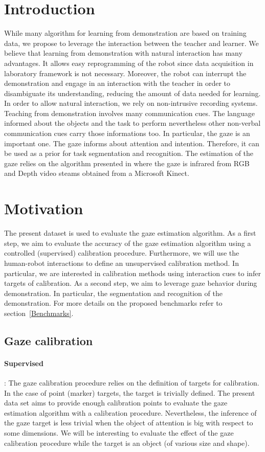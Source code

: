 \documentclass[11pt,a4paper]{article}
\begin{document}
\section{Introduction}
While many algorithm for learning from demonstration are based on training data, we propose to leverage the interaction between the teacher and learner. We believe that learning from demonstration with natural interaction has many advantages. It allows easy reprogramming of the robot since data acquisition in laboratory framework is not necessary. Moreover, the robot can interrupt the demonstration and engage in an interaction with the teacher in order to disambiguate its understanding, reducing the amount of data needed for learning.
\newline
In order to allow natural interaction, we rely on non-intrusive recording systems. Teaching from demonstration involves many communication cues. The language informed about the objects and the task to perform nevertheless other non-verbal communication cues carry those informations too. In particular, the gaze is an important one. 
\newline
The gaze informs about attention and intention. Therefore, it can be used as a prior for task segmentation and recognition. The estimation of the gaze relies on the algorithm presented in \cite{Funes2016} where the gaze is infrared from RGB and Depth video steams obtained from a Microsoft Kinect.

\section{Motivation}
The present dataset is used to evaluate the gaze estimation algorithm. As a first step, we aim to evaluate the accuracy of the gaze estimation algorithm using a controlled (supervised) calibration procedure. Furthermore, we will use the human-robot interactions to define an unsupervised calibration method. In particular, we are interested in calibration methods using interaction cues to infer targets of calibration. As a second step, we aim to leverage gaze behavior during demonstration. In particular, the segmentation and recognition of the demonstration. For more details on the proposed benchmarks refer to section~\ref{Benchmarks}.
\subsection{Gaze calibration}
\paragraph{Supervised}: The gaze calibration procedure relies on the definition of targets for calibration. In the case of point (marker) targets, the target is trivially defined. The present data set aims to provide enough calibration points to evaluate the gaze estimation algorithm with a calibration procedure. Nevertheless, the inference of the gaze target is less trivial when the object of attention is big with respect to some dimensions. We will be interesting to evaluate the effect of the gaze calibration procedure while the target is an object (of various size and shape).
\end{document}
